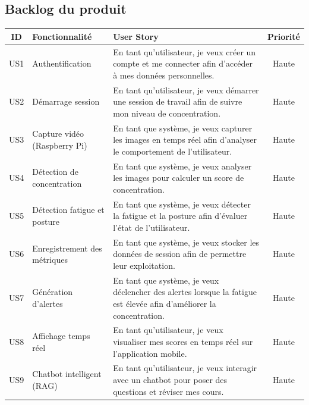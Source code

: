 \subsection{Backlog du produit}
{\singlespacing
\begin{table}[H]
\centering
\small
\renewcommand{\arraystretch}{1.2}
\setlength{\tabcolsep}{5pt}

\begin{tabularx}{\textwidth}{|c|p{3cm}|X|c|}
\hline
\textbf{ID} & \textbf{Fonctionnalité} & \textbf{User Story} & \textbf{Priorité} \\
\hline

US1 & Authentification
& En tant qu’utilisateur, je veux créer un compte et me connecter afin d’accéder à mes données personnelles.
& Haute \\ \hline

US2 & Démarrage session
& En tant qu’utilisateur, je veux démarrer une session de travail afin de suivre mon niveau de concentration.
& Haute \\ \hline

US3 & Capture vidéo (Raspberry Pi)
& En tant que système, je veux capturer les images en temps réel afin d’analyser le comportement de l’utilisateur.
& Haute \\ \hline

US4 & Détection de concentration
& En tant que système, je veux analyser les images pour calculer un score de concentration.
& Haute \\ \hline

US5 & Détection fatigue et posture
& En tant que système, je veux détecter la fatigue et la posture afin d’évaluer l’état de l’utilisateur.
& Haute \\ \hline

US6 & Enregistrement des métriques
& En tant que système, je veux stocker les données de session afin de permettre leur exploitation.
& Haute \\ \hline

US7 & Génération d’alertes
& En tant que système, je veux déclencher des alertes lorsque la fatigue est élevée afin d’améliorer la concentration.
& Haute \\ \hline

US8 & Affichage temps réel
& En tant qu’utilisateur, je veux visualiser mes scores en temps réel sur l’application mobile.
& Haute \\ \hline

US9 & Chatbot intelligent (RAG)
& En tant qu’utilisateur, je veux interagir avec un chatbot pour poser des questions et réviser mes cours.
& Haute \\ \hline


\end{tabularx}
\end{table}}
